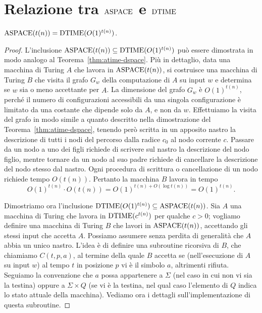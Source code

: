\section{Relazione tra \texorpdfstring{$\operatorname{ASPACE}$}{ASPACE} e \texorpdfstring{$\operatorname{DTIME}$}{DTIME}}

\begin{teorema}
  \label{thm:aspace-dtime}
  $\operatorname{ASPACE}(t(n)) = \operatorname{DTIME}(O(1)^{t(n)})$.
\end{teorema}

\begin{proof}
  L'inclusione $\operatorname{ASPACE}(t(n)) \subseteq \operatorname{DTIME}(O(1)^{t(n)})$ può essere dimostrata in modo analogo al
  Teorema~\ref{thm:atime-dspace}. Più in dettaglio, data una macchina di Turing $A$ che lavora in $\operatorname{ASPACE}(t(n))$,
  si costruisce una macchina di Turing $B$ che visita il grafo $G_w$ della computazione di $A$ su input $w$
  e determina se $w$ sia o meno accettante per $A$. La dimensione del grafo $G_w$ è $O(1)^{t(n)}$,
  perché il numero di configurazioni accessibili da una singola configurazione è limitato da una costante che dipende
  solo da $A$, e non da $w$.
  Effettuiamo la visita del grafo in modo simile a quanto descritto nella dimostrazione del Teorema~\ref{thm:atime-dspace}, tenendo però scritta in un apposito nastro la descrizione di tutti i nodi del percorso dalla radice $c_0$ al nodo corrente $c$.
  Passare da un nodo a uno dei figli richiede di scrivere sul nastro la descrizione del nodo figlio, mentre tornare da un nodo al suo padre richiede di cancellare la descrizione del nodo stesso dal nastro.
  Ogni procedura di scrittura o cancellazione di un nodo richiede tempo $O(t(n))$.
  Pertanto la macchina $B$ lavora in tempo
  \[ O(1)^{t(n)} \cdot O(t(n)) = O(1)^{ t(n) + O(\log t(n)) } = O(1)^{t(n)}. \]
  
  Dimostriamo ora l'inclusione $\operatorname{DTIME}(O(1)^{t(n)}) \subseteq \operatorname{ASPACE}(t(n))$.
  Sia $A$ una macchina di Turing che lavora in $\operatorname{DTIME}(c^{t(n)})$ per qualche $c>0$; vogliamo definire una macchina di Turing $B$ che lavori in $\operatorname{ASPACE}(t(n))$, accettando gli stessi input che accetta $A$.
  Possiamo assumere senza perdita di generalità che $A$ abbia un unico nastro.
  L'idea è di definire una subroutine ricorsiva di $B$, che chiamiamo $C(t,p,a)$, al termine della quale $B$ accetta se (nell'esecuzione di $A$ su input $w$) al tempo $t$ in posizione $p$ vi è il simbolo $a$, altrimenti rifiuta.
  Seguiamo la convenzione che $a$ possa appartenere a $\Sigma$ (nel caso in cui non vi sia la testina) oppure a $\Sigma\times Q$ (se vi è la testina, nel qual caso l'elemento di $Q$ indica lo stato attuale della macchina). Vediamo ora i dettagli sull'implementazione di questa subroutine.
  

\end{proof}
